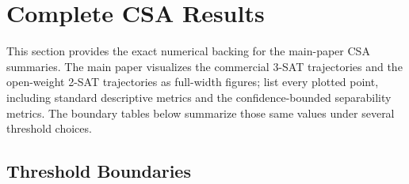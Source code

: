 \documentclass[10pt,conference]{IEEEtran}
\theoremstyle{remark}
\begin{document}
\section{Complete CSA Results}
\label{sec:supp-results}

This section provides the exact numerical backing for the main-paper CSA summaries.  The main paper visualizes the commercial 3-SAT trajectories and the open-weight 2-SAT trajectories as full-width figures;  list every plotted point, including standard descriptive metrics and the confidence-bounded separability metrics.  The boundary tables below summarize those same values under several threshold choices.

\subsection{Threshold Boundaries}

\begin{table}[ht]
\centering
\caption{Prefix boundaries for commercial 3-SAT models under several CSA thresholds.  The main paper uses $\tau=0.25$ as the default moderate two-sided threshold.}
\label{tab:supp-boundary-3sat}
\renewcommand{\arraystretch}{1.12}
\end{table}

\begin{table}[ht]
\centering
\caption{Prefix boundaries for open-weight thinking-mode 2-SAT models under several CSA thresholds.}
\label{tab:supp-boundary-2sat}
\renewcommand{\arraystretch}{1.12}
\end{table}
\end{document}
